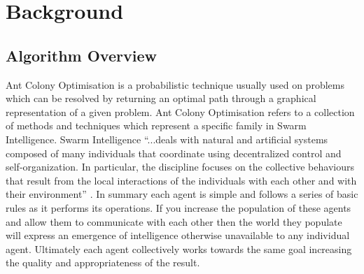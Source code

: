 \chapter{Background}
\label{chapt:bg}
\section{Algorithm Overview}
\label{agloover}
Ant Colony Optimisation is a probabilistic technique usually used on problems which can be resolved by returning an optimal path through a graphical representation of a given problem. Ant Colony Optimisation refers to a collection of methods and techniques which represent a specific family in Swarm Intelligence. Swarm Intelligence \enquote{...deals with natural and artificial systems composed of many individuals that coordinate using decentralized control and self-organization. In particular, the discipline focuses on the collective behaviours that result from the local interactions of the individuals with each other and with their environment} \cite{SI:def}. In summary each agent is simple and follows a series of basic rules as it performs its operations. If you increase the population of these agents and allow them to communicate with each other then the world they populate will express an emergence of intelligence otherwise unavailable to any individual agent. Ultimately each agent collectively works towards the same goal increasing the quality and appropriateness of the result.

